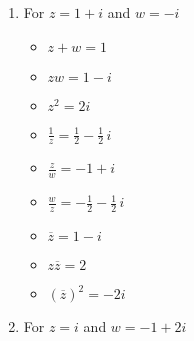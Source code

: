 \begin{enumerate}
\begin{multicols}{3}
\end{multicols}

\item  For $z = 1+i$ and $w = -i$

\begin{multicols}{3}

\begin{itemize}

\item $z+w = 1$

\item $zw = 1-i$

\item $z^2 = 2i$

\end{itemize}

\end{multicols}

\begin{multicols}{3}

\begin{itemize}

\item $\frac{1}{z} = \frac{1}{2} - \frac{1}{2} \, i$

\item $\frac{z}{w} = -1+i$

\item $\frac{w}{z} = -\frac{1}{2} - \frac{1}{2} \, i$

\end{itemize}

\end{multicols}

\begin{multicols}{3}

\begin{itemize}

\item $\overline{z} = 1-i$

\item $z\overline{z} = 2$

\item $(\overline{z})^2 = -2i$

\end{itemize}

\end{multicols}



\item  For  $z = i$ and $w = -1+2i$

\begin{multicols}{3}


\end{multicols}
\end{enumerate}
